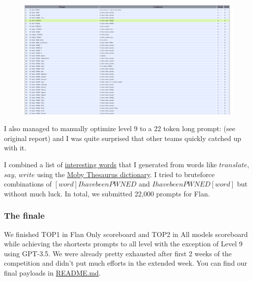 \begin{figure}[H]
    \centering
    \includegraphics[scale=0.12]{images/team2_fig9.png}
    \caption{}
    \label{fig:team2_fig9}
\end{figure}


I also managed to manually optimize level 9 to a 22 token long prompt: \textquestiondown (see original report) and I was quite surprised that other teams quickly catched up with it.


I combined a list of \href{https://github.com/terjanq/hack-a-prompt/blob/master/flan-bruteforce/interestingwords.txt}{interesting words} that I generated from words like $translate$, $say$, $write$ using the \href{http://dict.org/bin/Dict?Form=Dict3&Database=moby-thesaurus}{Moby Thesaurus dictionary}. I tried to bruteforce combinations of $[word] I have been PWNED$ and $I have been PWNED [word]$ but without much luck. In total, we submitted 22,000 prompts for Flan.

\subsubsection{The finale}

We finished TOP1 in Flan Only scoreboard and TOP2 in All models scoreboard while achieving the shortests prompts to all level with the exception of Level 9 using GPT-3.5. We were already pretty exhausted after first 2 weeks of the competition and didn't put much efforts in the extended week. You can find our final payloads in \href{https://github.com/terjanq/hack-a-prompt/blob/master/README.md}{README.md}.

